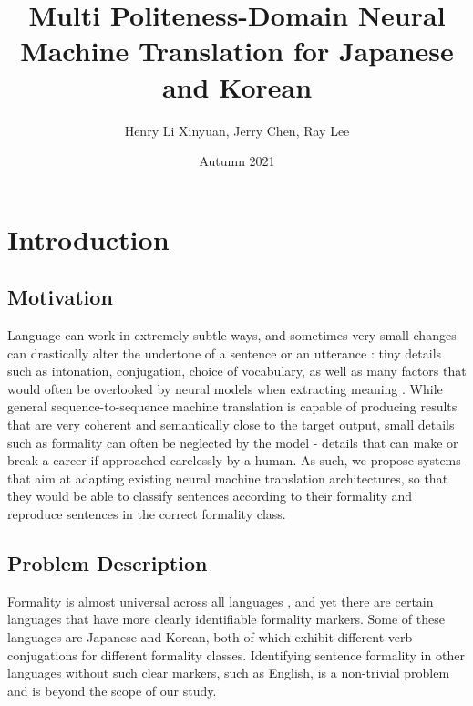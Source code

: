 \documentclass[11pt]{article}
\begin{document}
\title{Multi Politeness-Domain Neural Machine Translation for Japanese and Korean}

\author{Henry Li Xinyuan, Jerry Chen, Ray Lee}

\date{Autumn 2021}

\maketitle

\newpage

\tableofcontents

\newpage

\section{Introduction}

\subsection{Motivation}

Language can work in extremely subtle ways, and sometimes very small changes can drastically alter the undertone of a sentence or an utterance \cite{Feely:19} \cite{niu-etal-2018-multi}: tiny details such as intonation, conjugation, choice of vocabulary, as well as many factors that would often be overlooked by neural models when extracting meaning \cite{pavlick-tetreault-2016-empirical}. While general sequence-to-sequence machine translation is capable of producing results that are very coherent and semantically close to the target output, small details such as formality can often be neglected by the model \cite{rao2018dear} - details that can make or break a career if approached carelessly by a human. As such, we propose systems that aim at adapting existing neural machine translation architectures, so that they would be able to classify sentences according to their formality and reproduce sentences in the correct formality class. 

\subsection{Problem Description}

Formality is almost universal across all languages \cite{article}, and yet there are certain languages that have more clearly identifiable formality markers. Some of these languages are Japanese and Korean, both of which exhibit different verb conjugations for different formality classes. Identifying sentence formality in other languages without such clear markers, such as English, is a non-trivial problem \cite{pavlick-tetreault-2016-empirical} and is beyond the scope of our study. 
\end{document}
